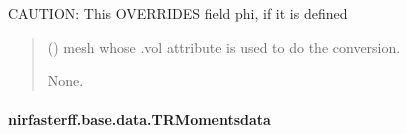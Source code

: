 \documentclass[letterpaper,10pt,english]{sphinxmanual}
\begin{document}
\begin{fulllineitems}
\begin{fulllineitems}
\sphinxAtStartPar
CAUTION: This OVERRIDES field phi, if it is defined
\begin{quote}\begin{description}
\sphinxAtStartPar
{} () \textendash{} mesh whose .vol attribute is used to do the conversion.

\sphinxAtStartPar
None.

\end{description}\end{quote}

\end{fulllineitems}


\end{fulllineitems}


\sphinxstepscope


\paragraph{nirfasterff.base.data.TRMomentsdata}
\label{\detokenize{_autosummary/nirfasterff.base.data.TRMomentsdata:nirfasterff-base-data-trmomentsdata}}\label{\detokenize{_autosummary/nirfasterff.base.data.TRMomentsdata::doc}}
\end{document}
